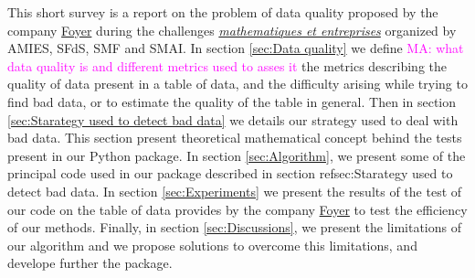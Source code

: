 \documentclass{article}
\newcommand\mabaach[1]{\textcolor{magenta}{MA: #1}}
\begin{document}
This short survey is a report on the problem of data quality proposed by the company \href{ https://www.foyer.lu/en/homepage}{Foyer} during the challenges \href{https://challenge-maths.sciencesconf.org/}{\textit{mathematiques et entreprises}} organized by AMIES,  SFdS, SMF and SMAI.
In section \ref{sec:Data quality} we define \mabaach{what data quality is and different metrics used to asses it} the metrics describing the quality of data present in a table of data, and the difficulty arising while trying to find bad data, or to estimate the quality of the table in general. Then in section \ref{sec:Starategy used to detect bad data} we details our strategy used to deal with bad data. This section present theoretical mathematical concept behind the tests present in our Python package. In section \ref{sec:Algorithm}, we present some of the principal code used in our package described in section ref{sec:Starategy used to detect bad data}. In section \ref{sec:Experiments} we present the results of the test of our code on the table of data provides by the company \href{ https://www.foyer.lu/en/homepage}{Foyer} to test the efficiency of our methods. Finally, in section \ref{sec:Discussions}, we present the limitations of our algorithm and we propose solutions to overcome this limitations, and develope further the package.

\end{document}
